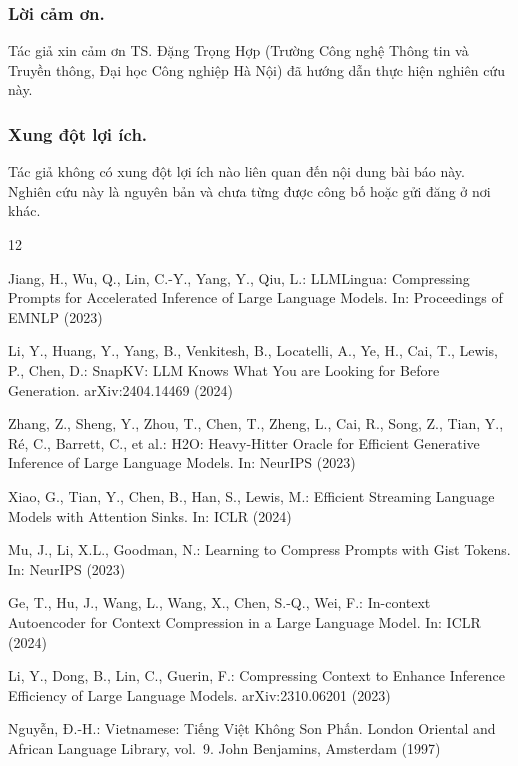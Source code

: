 \documentclass[runningheads]{llncs}
\begin{document}
\begin{credits}
\subsubsection{Lời cảm ơn.} Tác giả xin cảm ơn TS. Đặng Trọng Hợp (Trường Công nghệ Thông tin và Truyền thông, Đại học Công nghiệp Hà Nội) đã hướng dẫn thực hiện nghiên cứu này.
\subsubsection{Xung đột lợi ích.} Tác giả không có xung đột lợi ích nào liên quan đến nội dung bài báo này. Nghiên cứu này là nguyên bản và chưa từng được công bố hoặc gửi đăng ở nơi khác.
\end{credits}

\begin{thebibliography}{12}

Jiang, H., Wu, Q., Lin, C.-Y., Yang, Y., Qiu, L.: LLMLingua: Compressing Prompts for Accelerated Inference of Large Language Models. In: Proceedings of EMNLP (2023)

Li, Y., Huang, Y., Yang, B., Venkitesh, B., Locatelli, A., Ye, H., Cai, T., Lewis, P., Chen, D.: SnapKV: LLM Knows What You are Looking for Before Generation. arXiv:2404.14469 (2024)

Zhang, Z., Sheng, Y., Zhou, T., Chen, T., Zheng, L., Cai, R., Song, Z., Tian, Y., Ré, C., Barrett, C., et al.: H2O: Heavy-Hitter Oracle for Efficient Generative Inference of Large Language Models. In: NeurIPS (2023)

Xiao, G., Tian, Y., Chen, B., Han, S., Lewis, M.: Efficient Streaming Language Models with Attention Sinks. In: ICLR (2024)

Mu, J., Li, X.L., Goodman, N.: Learning to Compress Prompts with Gist Tokens. In: NeurIPS (2023)

Ge, T., Hu, J., Wang, L., Wang, X., Chen, S.-Q., Wei, F.: In-context Autoencoder for Context Compression in a Large Language Model. In: ICLR (2024)

Li, Y., Dong, B., Lin, C., Guerin, F.: Compressing Context to Enhance Inference Efficiency of Large Language Models. arXiv:2310.06201 (2023)

Nguyễn, Đ.-H.: Vietnamese: Tiếng Việt Không Son Phấn. London Oriental and African Language Library, vol.~9. John Benjamins, Amsterdam (1997)


\end{thebibliography}
\end{document}
